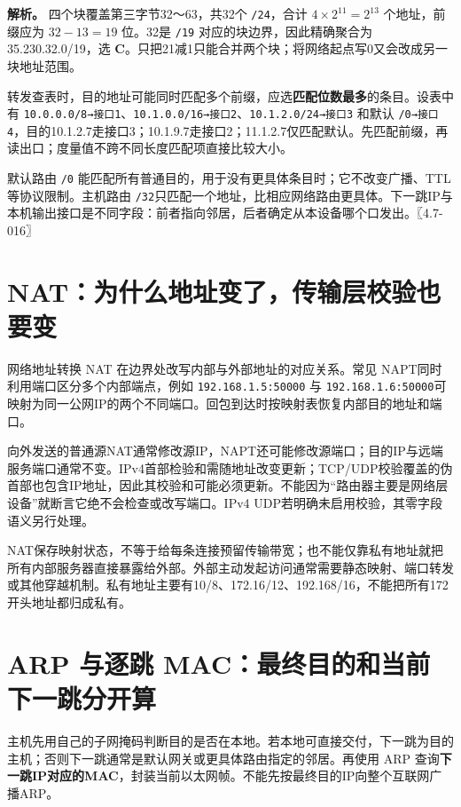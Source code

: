 \textbf{解析。} 四个块覆盖第三字节32～63，共32个 \texttt{/24}，合计 \(4\times2^{11}=2^{13}\) 个地址，前缀应为 \(32-13=19\) 位。32是 \texttt{/19} 对应的块边界，因此精确聚合为35.230.32.0/19，选 \textbf{C}。只把21减1只能合并两个块；将网络起点写0又会改成另一块地址范围。

转发查表时，目的地址可能同时匹配多个前缀，应选\textbf{匹配位数最多}的条目。设表中有 \texttt{10.0.0.0/8→接口1}、\texttt{10.1.0.0/16→接口2}、\texttt{10.1.2.0/24→接口3} 和默认 \texttt{/0→接口4}，目的10.1.2.7走接口3；10.1.9.7走接口2；11.1.2.7仅匹配默认。先匹配前缀，再读出口；度量值不跨不同长度匹配项直接比较大小。

默认路由 \texttt{/0} 能匹配所有普通目的，用于没有更具体条目时；它不改变广播、TTL等协议限制。主机路由 \texttt{/32}只匹配一个地址，比相应网络路由更具体。下一跳IP与本机输出接口是不同字段：前者指向邻居，后者确定从本设备哪个口发出。〖4.7-016〗

\section{NAT：为什么地址变了，传输层校验也要变}\label{cn-04-10}

网络地址转换 NAT 在边界处改写内部与外部地址的对应关系。常见 NAPT同时利用端口区分多个内部端点，例如 \texttt{192.168.1.5:50000} 与 \texttt{192.168.1.6:50000}可映射为同一公网IP的两个不同端口。回包到达时按映射表恢复内部目的地址和端口。

向外发送的普通源NAT通常修改源IP，NAPT还可能修改源端口；目的IP与远端服务端口通常不变。IPv4首部检验和需随地址改变更新；TCP/UDP校验覆盖的伪首部也包含IP地址，因此其校验和可能必须更新。不能因为``路由器主要是网络层设备''就断言它绝不会检查或改写端口。IPv4 UDP若明确未启用校验，其零字段语义另行处理。

NAT保存映射状态，不等于给每条连接预留传输带宽；也不能仅靠私有地址就把所有内部服务器直接暴露给外部。外部主动发起访问通常需要静态映射、端口转发或其他穿越机制。私有地址主要有10/8、172.16/12、192.168/16，不能把所有172开头地址都归成私有。

\section{ARP 与逐跳 MAC：最终目的和当前下一跳分开算}\label{cn-04-11}

主机先用自己的子网掩码判断目的是否在本地。若本地可直接交付，下一跳为目的主机；否则下一跳通常是默认网关或更具体路由指定的邻居。再使用 ARP 查询\textbf{下一跳IP对应的MAC}，封装当前以太网帧。不能先按最终目的IP向整个互联网广播ARP。

